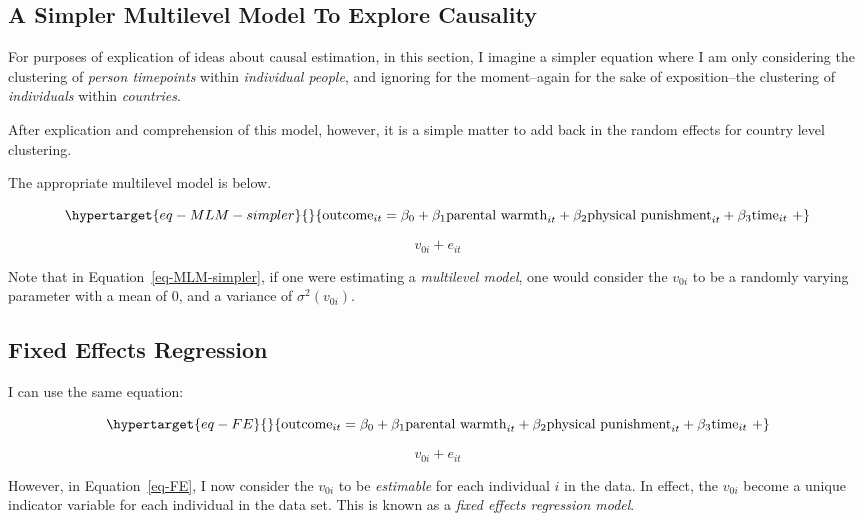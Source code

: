 \documentclass[
  letterpaper,
  DIV=11,
  numbers=noendperiod]{scrreprt}
\begin{document}
\hypertarget{a-simpler-multilevel-model-to-explore-causality}{%
\subsection{A Simpler Multilevel Model To Explore
Causality}\label{a-simpler-multilevel-model-to-explore-causality}}

For purposes of explication of ideas about causal estimation, in this
section, I imagine a simpler equation where I am only considering the
clustering of \emph{person timepoints} within \emph{individual people},
and ignoring for the moment--again for the sake of exposition--the
clustering of \emph{individuals} within \emph{countries}.

After explication and comprehension of this model, however, it is a
simple matter to add back in the random effects for country level
clustering.

The appropriate multilevel model is below.

\begin{equation}\protect\hypertarget{eq-MLM-simpler}{}{\text{outcome}_{it} = \beta_0 + \beta_1 \text{parental warmth}_{it} + \beta_2 \text{physical punishment}_{it} + \beta_3 \text{time}_{it} \ + }\label{eq-MLM-simpler}\end{equation}

\[v_{0i} + e_{it}\]

Note that in Equation~\ref{eq-MLM-simpler}, if one were estimating a
\emph{multilevel model}, one would consider the \(v_{0i}\) to be a
randomly varying parameter with a mean of 0, and a variance of
\(\sigma^2(v_{0i})\).

\hypertarget{fixed-effects-regression}{%
\subsection{Fixed Effects Regression}\label{fixed-effects-regression}}

I can use the same equation:

\begin{equation}\protect\hypertarget{eq-FE}{}{\text{outcome}_{it} = \beta_0 + \beta_1 \text{parental warmth}_{it} + \beta_2 \text{physical punishment}_{it} + \beta_3 \text{time}_{it} \ + }\label{eq-FE}\end{equation}

\[v_{0i} + e_{it}\]

However, in Equation~\ref{eq-FE}, I now consider the \(v_{0i}\) to be
\emph{estimable} for each individual \(i\) in the data. In effect, the
\(v_{0i}\) become a unique indicator variable for each individual in the
data set. This is known as a \emph{fixed effects regression model}.
\end{document}
